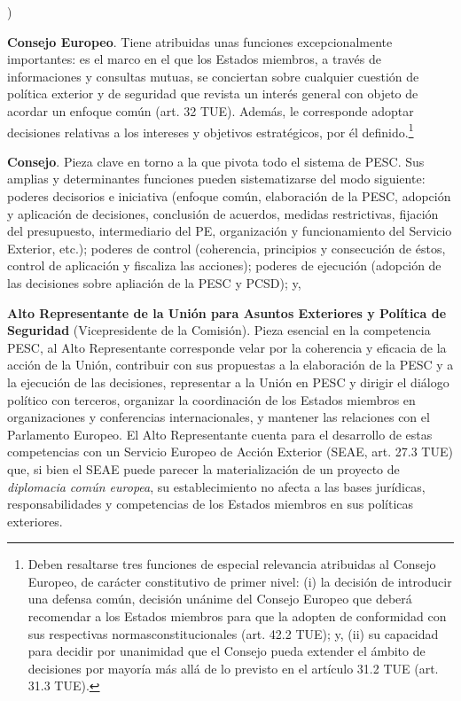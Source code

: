 \documentclass[10pt,a4paper]{article}
\newcounter{alphaitem}
\newenvironment{la}
      {\begin{list}{\alph{alphaitem})}{%
          \usecounter{alphaitem}%
          \setlength{\leftmargin}{1cm}%
          \setlength{\parskip}{3pt}%
          \setlength{\itemsep}{0pt}%
          \setlength{\parsep}{0pt}%
      }}
      {\end{list}}
\begin{document}
\begin{la}
    \item \textbf{Consejo Europeo}. Tiene atribuidas unas funciones excepcionalmente importantes: es el marco en el que los Estados miembros, a través de informaciones y consultas mutuas, se conciertan sobre cualquier cuestión de política exterior y de seguridad que revista un interés general con objeto de acordar un enfoque común (art. 32 TUE). Además, le corresponde adoptar decisiones relativas a los intereses y objetivos estratégicos, por él definido.\footnote{%
        Deben resaltarse tres funciones de especial relevancia atribuidas al Consejo Europeo, de carácter constitutivo de primer nivel: (i) la decisión de introducir una defensa común, decisión unánime del Consejo Europeo que deberá recomendar a los Estados miembros para que la adopten de conformidad con sus respectivas normasconstitucionales (art. 42.2 TUE); y, (ii) su capacidad para decidir por unanimidad que el Consejo pueda extender el ámbito de decisiones por mayoría más allá de lo previsto en el artículo 31.2 TUE (art. 31.3 TUE).
    }
    \item \textbf{Consejo}. Pieza clave en torno a la que pivota todo el sistema de PESC. Sus amplias y determinantes funciones pueden sistematizarse del modo siguiente: poderes decisorios e iniciativa (enfoque común, elaboración de la PESC, adopción y aplicación de decisiones, conclusión de acuerdos, medidas restrictivas, fijación del presupuesto, intermediario del PE, organización y funcionamiento del Servicio Exterior, etc.); poderes de control (coherencia, principios y consecución de éstos, control de aplicación y fiscaliza las acciones); poderes de ejecución (adopción de las decisiones sobre apliación de la PESC y PCSD); y,
    \item \textbf{Alto Representante de la Unión para Asuntos Exteriores y Política de Seguridad} (Vicepresidente de la Comisión). Pieza esencial en la competencia PESC, al Alto Representante corresponde velar por la coherencia y eficacia de la acción de la Unión, contribuir con sus propuestas a la elaboración de la PESC y a la ejecución de las decisiones, representar a la Unión en PESC y dirigir el diálogo político con terceros, organizar la coordinación de los Estados miembros en organizaciones y conferencias internacionales, y mantener las relaciones con el Parlamento Europeo. El Alto Representante cuenta para el desarrollo de estas competencias con un Servicio Europeo de Acción Exterior (SEAE, art. 27.3 TUE) que, si bien el SEAE puede parecer la materialización de un proyecto de \textit{diplomacia común europea}, su establecimiento no afecta a las bases jurídicas, responsabilidades y competencias de los Estados miembros en sus políticas exteriores.
\end{la}
\end{document}
